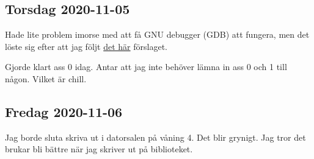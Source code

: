 \subsection{Torsdag 2020-11-05}

Hade lite problem imorse med att få GNU debugger (GDB) att fungera, men det löste sig efter att jag följt \href{https://stackoverflow.com/questions/48278881/gdb-complaining-about-missing-raise-c/48287761}{\color{blue}det här} förslaget.

Gjorde klart ass 0 idag. Antar att jag inte behöver lämna in ass 0 och 1 till någon. Vilket är chill.


\subsection{Fredag 2020-11-06}

Jag borde sluta skriva ut i datorsalen på våning 4. Det blir grynigt. Jag tror det brukar bli bättre när jag skriver ut på biblioteket.


